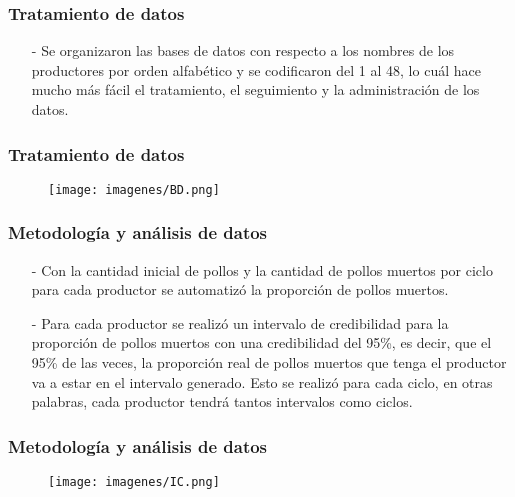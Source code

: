 \documentclass[11pt]{beamer}
\begin{document}
\begin{frame}
\frametitle{Tratamiento de datos}
\begin{itemize}
\item[-]Se organizaron las bases de datos con respecto a los nombres de los productores por orden alfabético y se codificaron del 1 al 48, lo cuál hace mucho más fácil el tratamiento, el seguimiento y la administración de los datos.
\end{itemize}
\end{frame}

\begin{frame}
\frametitle{Tratamiento de datos}
\begin{figure}[!h]
        \texttt{[image: imagenes/BD.png]}
        \label{figura1}
\end{figure}
\end{frame}


\begin{frame}
\frametitle{Metodología y análisis de datos}
\begin{itemize}
\item[-]Con la cantidad inicial de pollos y la cantidad de pollos muertos por ciclo para cada productor se automatizó la proporción de pollos muertos.
\item[-]Para cada productor se realizó un intervalo de credibilidad para la proporción de pollos muertos con una credibilidad del 95\%, es decir, que el 95\% de las veces, la proporción real de pollos muertos que tenga el productor va a estar en el intervalo generado. Esto se realizó para cada ciclo, en otras palabras, cada productor tendrá tantos intervalos como ciclos.
\end{itemize}
\end{frame}

\begin{frame}
\frametitle{Metodología y análisis de datos}
\begin{figure}[!h]
        \texttt{[image: imagenes/IC.png]}
        \label{figura1}
\end{figure}
\end{frame}
\end{document}
